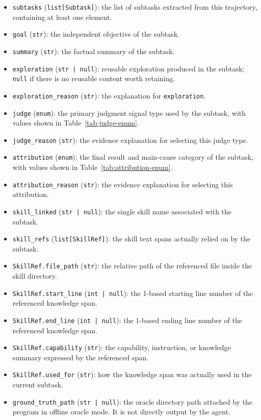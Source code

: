 \begin{itemize}
    \item \texttt{subtasks} (\texttt{list[Subtask]}): the list of subtasks extracted from this trajectory, containing at least one element.
    \item \texttt{goal} (\texttt{str}): the independent objective of the subtask.
    \item \texttt{summary} (\texttt{str}): the factual summary of the subtask.
    \item \texttt{exploration} (\texttt{str | null}): reusable exploration produced in the subtask; \texttt{null} if there is no reusable content worth retaining.
    \item \texttt{exploration\_reason} (\texttt{str}): the explanation for \texttt{exploration}.
    \item \texttt{judge} (\texttt{enum}): the primary judgment signal type used by the subtask, with values shown in Table~\ref{tab:judge-enum}.
    \item \texttt{judge\_reason} (\texttt{str}): the evidence explanation for selecting this judge type.
    \item \texttt{attribution} (\texttt{enum}): the final result and main-cause category of the subtask, with values shown in Table~\ref{tab:attribution-enum}.
    \item \texttt{attribution\_reason} (\texttt{str}): the evidence explanation for selecting this attribution.
    \item \texttt{skill\_linked} (\texttt{str | null}): the single skill name associated with the subtask.
    \item \texttt{skill\_refs} (\texttt{list[SkillRef]}): the skill text spans actually relied on by the subtask.
    \item \texttt{SkillRef.file\_path} (\texttt{str}): the relative path of the referenced file inside the skill directory.
    \item \texttt{SkillRef.start\_line} (\texttt{int | null}): the 1-based starting line number of the referenced knowledge span.
    \item \texttt{SkillRef.end\_line} (\texttt{int | null}): the 1-based ending line number of the referenced knowledge span.
    \item \texttt{SkillRef.capability} (\texttt{str}): the capability, instruction, or knowledge summary expressed by the referenced span.
    \item \texttt{SkillRef.used\_for} (\texttt{str}): how the knowledge span was actually used in the current subtask.
    \item \texttt{ground\_truth\_path} (\texttt{str | null}): the oracle directory path attached by the program in offline oracle mode. It is not directly output by the agent.
\end{itemize}

